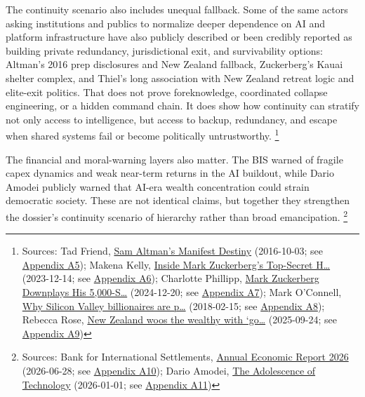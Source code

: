 \documentclass[
  american,
  11pt,
  letterpaper,
]{article}
\begin{document}
The continuity scenario also includes unequal fallback. Some of the same
actors asking institutions and publics to normalize deeper dependence on
AI and platform infrastructure have also publicly described or been
credibly reported as building private redundancy, jurisdictional exit,
and survivability options: Altman's 2016 prep disclosures and New
Zealand fallback, Zuckerberg's Kauai shelter complex, and Thiel's long
association with New Zealand retreat logic and elite-exit politics. That
does not prove foreknowledge, coordinated collapse engineering, or a
hidden command chain. It does show how continuity can stratify not only
access to intelligence, but access to backup, redundancy, and escape
when shared systems fail or become politically untrustworthy.
\footnote{Sources: Tad Friend,
  \href{https://www.newyorker.com/magazine/2016/10/10/sam-altmans-manifest-destiny}{Sam
  Altman's Manifest Destiny} (2016-10-03; see
  \hyperref[ch-09-appendix-a5-sam-altman-s-manifest-destiny]{Appendix
  A5}); Makena Kelly,
  \href{https://www.wired.com/story/mark-zuckerberg-inside-hawaii-compound}{Inside
  Mark Zuckerberg's Top-Secret H\ldots{}} (2023-12-14; see
  \hyperref[ch-09-appendix-a6-inside-mark-zuckerbergs-top-secret-hawaii-compound]{Appendix
  A6}); Charlotte Phillipp,
  \href{https://people.com/mark-zuckerberg-hawaii-bunker-5000-square-feet-8765376}{Mark
  Zuckerberg Downplays His 5,000-S\ldots{}} (2024-12-20; see
  \hyperref[ch-09-appendix-a7-mark-zuckerberg-downplays-his-5-000-square-foot-underground-bunker-in-hawaii-just-a-little-shelter]{Appendix
  A7}); Mark O'Connell,
  \href{https://www.theguardian.com/news/2018/feb/15/why-silicon-valley-billionaires-are-prepping-for-the-apocalypse-in-new-zealand}{Why
  Silicon Valley billionaires are p\ldots{}} (2018-02-15; see
  \hyperref[ch-09-appendix-a8-why-silicon-valley-billionaires-are-prepping-for-the-apocalypse-in-new-zealand]{Appendix
  A8}); Rebecca Rose,
  \href{https://www.ft.com/content/76ca455c-3b16-4413-8738-3f17431d125b}{New
  Zealand woos the wealthy with `go\ldots{}} (2025-09-24; see
  \hyperref[ch-09-appendix-a9-new-zealand-woos-the-wealthy-with-golden-visa-changes]{Appendix
  A9})}

The financial and moral-warning layers also matter. The BIS warned of
fragile capex dynamics and weak near-term returns in the AI buildout,
while Dario Amodei publicly warned that AI-era wealth concentration
could strain democratic society. These are not identical claims, but
together they strengthen the dossier's continuity scenario of hierarchy
rather than broad emancipation. \footnote{Sources: Bank for
  International Settlements,
  \href{https://www.bis.org/publ/arpdf/ar2026e.pdf}{Annual Economic
  Report 2026} (2026-06-28; see
  \hyperref[ch-09-appendix-a10-annual-economic-report-2026]{Appendix
  A10}); Dario Amodei,
  \href{https://darioamodei.com/essay/the-adolescence-of-technology}{The
  Adolescence of Technology} (2026-01-01; see
  \hyperref[ch-09-appendix-a11-the-adolescence-of-technology]{Appendix
  A11})}
\end{document}
